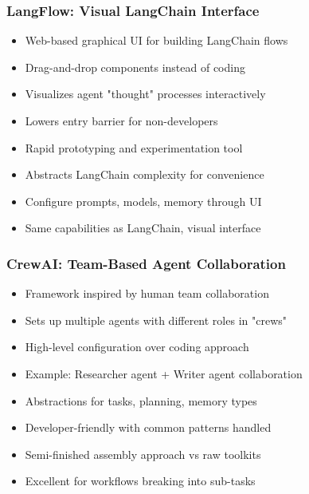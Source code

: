 \begin{frame}[fragile]\frametitle{LangFlow: Visual LangChain Interface}
      \begin{itemize}
	  \item Web-based graphical UI for building LangChain flows
	  \item Drag-and-drop components instead of coding
	  \item Visualizes agent "thought" processes interactively
	  \item Lowers entry barrier for non-developers
	  \item Rapid prototyping and experimentation tool
	  \item Abstracts LangChain complexity for convenience
	  \item Configure prompts, models, memory through UI
	  \item Same capabilities as LangChain, visual interface
	  \end{itemize}
\end{frame}

\begin{frame}[fragile]\frametitle{CrewAI: Team-Based Agent Collaboration}
      \begin{itemize}
	  \item Framework inspired by human team collaboration
	  \item Sets up multiple agents with different roles in "crews"
	  \item High-level configuration over coding approach
	  \item Example: Researcher agent + Writer agent collaboration
	  \item Abstractions for tasks, planning, memory types
	  \item Developer-friendly with common patterns handled
	  \item Semi-finished assembly approach vs raw toolkits
	  \item Excellent for workflows breaking into sub-tasks
	  \end{itemize}
\end{frame}

